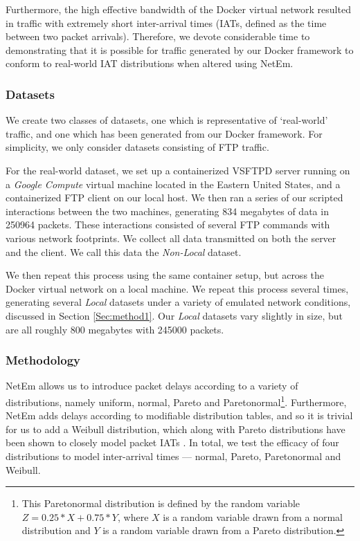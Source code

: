 \documentclass[sigconf]{acmart}
\begin{document}
Furthermore, the high effective bandwidth of the Docker virtual network resulted in traffic with extremely short inter-arrival times (IATs, defined as the time between two packet arrivals). Therefore, we devote considerable time to demonstrating that it is possible for traffic generated by our Docker framework to conform to real-world IAT distributions when altered using NetEm.


\subsubsection*{Datasets} We create two classes of datasets, one which is representative of `real-world' traffic, and one which has been generated from our Docker framework. For simplicity, we only consider datasets consisting of FTP traffic.

For the real-world dataset, we set up a containerized VSFTPD server running on a \emph{Google Compute} virtual machine located in the Eastern United States, and a containerized FTP client on our local host. We then ran a series of our scripted interactions between the two machines, generating 834 megabytes of data in 250964 packets. These interactions consisted of several FTP commands with various network footprints. We collect all data transmitted on both the server and the client. We call this data the \textit{Non-Local} dataset.

We then repeat this process using the same container setup, but across the Docker virtual network on a local machine. We repeat this process several times, generating several \textit{Local} datasets under a variety of emulated network conditions, discussed in Section \ref{Sec:method1}. Our \textit{Local} datasets vary slightly in size, but are all roughly 800 megabytes with 245000 packets. %


\subsubsection*{Methodology}
\label{Sec:method1}


NetEm allows us to introduce packet delays according to a variety of distributions, namely uniform, normal, Pareto and Paretonormal\footnote{This Paretonormal distribution is defined by the random variable $Z = 0.25*X + 0.75*Y$, where $X$ is a random variable drawn from a normal distribution and $Y$ is a random variable drawn from a Pareto distribution.}. Furthermore, NetEm adds delays according to modifiable distribution tables, and so it is trivial for us to add a Weibull distribution, which along with Pareto distributions have been shown to closely model packet IATs \cite{arfeen2013role,paxson1995wide}.
In total, we test the efficacy of four distributions to model inter-arrival times --- normal, Pareto, Paretonormal and Weibull. 
 
\end{document}
